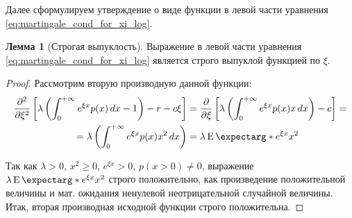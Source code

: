 \documentclass[a4paper,12pt]{article}
\theoremstyle{definition}
\newtheorem{lemma}{Лемма}
\newcommand{\expect}{\operatorname{E}\expectarg}
\begin{document}
Далее сформулируем утверждение о виде функции в левой части уравнения \eqref{eq:martingale_cond_for_xi_log}.
\begin{lemma}[Строгая выпуклость]\label{thm:strict_convexity_m1}
Выражение в левой части уравнения \eqref{eq:martingale_cond_for_xi_log} является строго выпуклой функцией по $\xi$.
\end{lemma}
\begin{proof}
Рассмотрим вторую производную данной функции:
\begin{equation*}
\begin{split}
     \pdv[2]{}{\xi} \left[\lambda \left(\int_{0}^{+\infty} e^{\xi x} p(x) \,dx - 1\right) - r - c\xi \right] &= \pdv{}{\xi} \left[\lambda \left(\int_{0}^{+\infty} e^{\xi x} p(x) x \,dx \right) - c \right] =\\
     = \lambda \left(\int_{0}^{+\infty} e^{\xi x} p(x) x^{2} \,dx \right) &= \lambda \expect*{e^{\xi x} x^2}
\end{split}
\end{equation*}

Так как $\lambda > 0$, $x^2 \ge 0$, $e^{\xi x} > 0$, $p(x > 0) \neq 0$, выражение $\lambda \expect*{e^{\xi x} x^2}$ строго положительно, как произведение положительной величины и мат. ожидания ненулевой неотрицательной случайной величины. Итак, вторая производная исходной функции строго положительна.

\end{proof}
\end{document}
